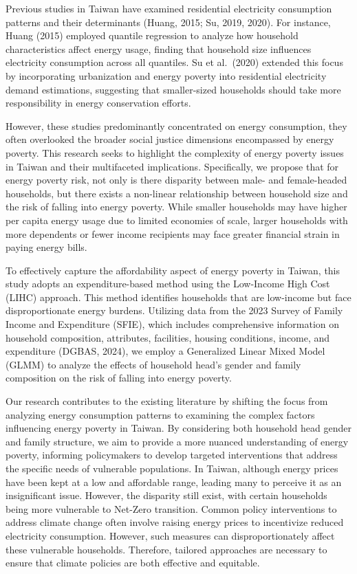 \documentclass[
  twoside,
  openright,
  degree    = master,               %
  language  = english,              %
  fontset   = overleaf,             %
  watermark = true,                 %
  doi       = true,                 %
]{ntuthesis}
\begin{document}
Previous studies in Taiwan have examined residential electricity
consumption patterns and their determinants (Huang, 2015; Su, 2019,
2020). For instance, Huang (2015) employed quantile regression to
analyze how household characteristics affect energy usage, finding that
household size influences electricity consumption across all quantiles.
Su et al.~(2020) extended this focus by incorporating urbanization and
energy poverty into residential electricity demand estimations,
suggesting that smaller-sized households should take more responsibility
in energy conservation efforts.

However, these studies predominantly concentrated on energy consumption,
they often overlooked the broader social justice dimensions encompassed
by energy poverty. This research seeks to highlight the complexity of
energy poverty issues in Taiwan and their multifaceted implications.
Specifically, we propose that for energy poverty risk, not only is there
disparity between male- and female-headed households, but there exists a
non-linear relationship between household size and the risk of falling
into energy poverty. While smaller households may have higher per capita
energy usage due to limited economies of scale, larger households with
more dependents or fewer income recipients may face greater financial
strain in paying energy bills.

To effectively capture the affordability aspect of energy poverty in
Taiwan, this study adopts an expenditure-based method using the
Low-Income High Cost (LIHC) approach. This method identifies households
that are low-income but face disproportionate energy burdens. Utilizing
data from the 2023 Survey of Family Income and Expenditure (SFIE), which
includes comprehensive information on household composition, attributes,
facilities, housing conditions, income, and expenditure (DGBAS, 2024),
we employ a Generalized Linear Mixed Model (GLMM) to analyze the effects
of household head's gender and family composition on the risk of falling
into energy poverty.

Our research contributes to the existing literature by shifting the
focus from analyzing energy consumption patterns to examining the
complex factors influencing energy poverty in Taiwan. By considering
both household head gender and family structure, we aim to provide a
more nuanced understanding of energy poverty, informing policymakers to
develop targeted interventions that address the specific needs of
vulnerable populations. In Taiwan, although energy prices have been kept
at a low and affordable range, leading many to perceive it as an
insignificant issue. However, the disparity still exist, with certain
households being more vulnerable to Net-Zero transition. Common policy
interventions to address climate change often involve raising energy
prices to incentivize reduced electricity consumption. However, such
measures can disproportionately affect these vulnerable households.
Therefore, tailored approaches are necessary to ensure that climate
policies are both effective and equitable.
\end{document}
